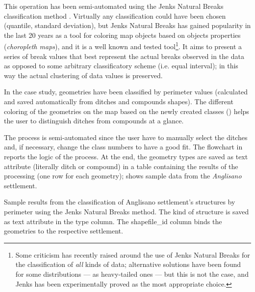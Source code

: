             This operation has been semi-automated using the Jenks Natural Breaks classification method \cite{jenks1977}. Virtually any classification could have been chosen (quantile, standard deviation), but Jenks Natural Breaks has gained popularity in the last 20 years as a tool for coloring map objects based on objects properties (\emph{choropleth maps}), and it is a well known and tested tool\footnote{Some criticism has recently raised around the use of Jenks Natural Breaks for the classification of \emph{all} kinds of data; alternative solutions have been found for some distributions --- as heavy-tailed ones \cite{jenks-tail} --- but this is not the case, and Jenks has been experimentally proved as the most appropriate choice.}. It aims to present a series of break values that best represent the actual breaks observed in the data as opposed to some arbitrary classificatory scheme (i.e. equal interval); in this way the actual clustering of data values is preserved.

            In the case study, geometries have been classified by perimeter values (calculated and saved automatically from ditches and compounds shapes). The different coloring of the geometries on the map based on the newly created classes () helps the user to distinguish ditches from compounds at a glance.

            The process is semi-automated since the user have to manually select the ditches and, if necessary, change the class numbers to have a good fit. The flowchart in  reports the logic of the process. At the end, the geometry types are saved as text attribute (literally \textsf{ditch} or \textsf{compound}) in a table containing the results of the processing (one row for each geometry);  shows sample data from the \emph{Anglisano} settlement.

            \begin{table}
                \centering
                
                \caption[Sample geometry classification results from Anglisano settlements using Jenk Natural Breaks method]{Sample results from the classification of Anglisano settlement's structures by perimeter using the Jenks Natural Breaks method. The kind of structure is saved as text attribute in the \textsf{type} column. The \textsf{shapefile\_id} column binds the geometries to the respective settlement.}
                \label{tab:jnb-results}
            \end{table}

